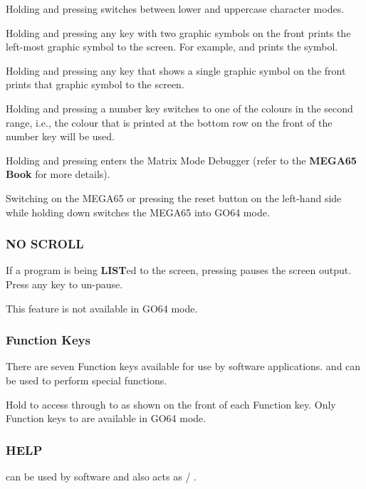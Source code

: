 Holding  and pressing \megasymbolkey switches between lower and uppercase character modes.

Holding \megasymbolkey and pressing any key with two graphic symbols on the front prints the left-most graphic symbol to the screen. For example,
\megasymbolkey and  prints the  symbol.

Holding \megasymbolkey and pressing any key that shows a single graphic symbol on the front prints that graphic symbol to the screen.

Holding \megasymbolkey and pressing a number key switches to one of the colours in the second range, i.e., the colour that is printed at the bottom row on the front of the number key will be used.

Holding \megasymbolkey and pressing  enters the Matrix Mode Debugger (refer to the {\bf MEGA65 Book} for more details).

Switching on the MEGA65 or pressing the reset button on the left-hand side while holding down \megasymbolkey switches the MEGA65 into GO64 mode.

\subsubsection{NO SCROLL}
If a program is being {\bf LIST}ed to the screen, pressing  pauses the screen output. Press any key to un-pause.

This feature is not available in GO64 mode.

\subsubsection{Function Keys}
There are seven Function keys available for use by software applications.       and  can be used to perform special functions.

Hold  to access  through to  as shown on the front of each Function key.
Only Function keys  to  are available in GO64 mode.

\subsubsection{HELP}
 can be used by software and also acts as  / .

